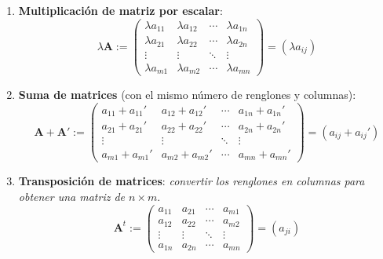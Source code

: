 \documentclass[8pt,a4paper]{article}
\begin{document}
\begin{enumerate}
		\begin{enumerate}
			\item \textbf{Multiplicación de matriz por escalar}:
				\[
				\lambda \mathbf{A}:=
					\begin{pmatrix}
							\lambda a_{11} & \lambda a_{12} & \cdots & \lambda a_{1n} \\
							\lambda a_{21} & \lambda a_{22} & \cdots & \lambda a_{2n} \\
							\vdots & \vdots & \ddots & \vdots \\
							\lambda a_{m1} & \lambda a_{m2} & \cdots & \lambda a_{mn}
					\end{pmatrix}=\left(\lambda a_{ij}\right)
				\]
			\item \textbf{Suma de matrices} (con el mismo número de renglones y columnas):
				\[
				\mathbf{A}+\mathbf{A}':=\begin{pmatrix}
							a_{11}+a_{11}' & a_{12}+a_{12}' & \cdots & a_{1n}+a_{1n}' \\
							a_{21}+a_{21}' & a_{22}+a_{22}' & \cdots & a_{2n}+a_{2n}' \\
							\vdots & \vdots & \ddots & \vdots \\
							a_{m1}+a_{m1}' & a_{m2}+a_{m2}' & \cdots & a_{mn}+a_{mn}'
						\end{pmatrix}=\left(a_{ij}+a_{ij}'\right)
				\]
			\item \textbf{Transposición de matrices}: \textit{convertir los renglones en columnas para obtener una matriz de $n\times m$}.
				\[
				\mathbf{A}^t:=
					\begin{pmatrix}
							a_{11} & a_{21} & \cdots & a_{m1} \\
							a_{12} & a_{22} & \cdots & a_{m2} \\
							\vdots & \vdots & \ddots & \vdots \\
							a_{1n} & a_{2n} & \cdots & a_{mn}
					\end{pmatrix}=\left(a_{ji}\right)
				\]
		\end{enumerate}
		

\end{enumerate}
\end{document}
